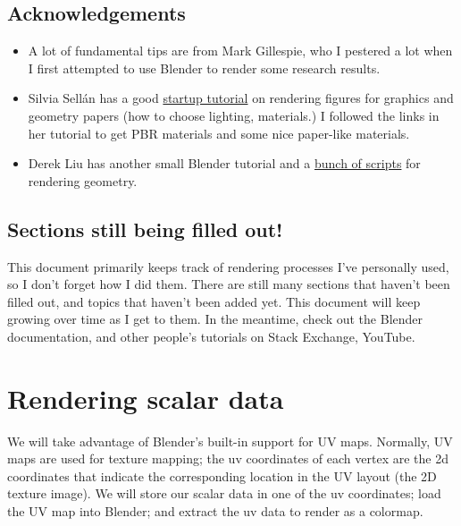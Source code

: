\documentclass[10pt]{article}
\begin{document}
\subsection{Acknowledgements}
\begin{itemize}
    \item A lot of fundamental tips are from Mark Gillespie, who I pestered a lot when I first attempted to use Blender to render some research results.
    \item Silvia Sell\'an has a good \href{https://www.silviasellan.com/blender_figure.html}{startup tutorial} on rendering figures for graphics and geometry papers (how to choose lighting, materials.) I followed the links in her tutorial to get PBR materials and some nice paper-like materials.
    \item Derek Liu has another small Blender tutorial and a \href{https://github.com/HTDerekLiu/BlenderToolbox}{bunch of scripts} for rendering geometry.
\end{itemize}

\subsection{Sections still being filled out!}
This document primarily keeps track of rendering processes I've personally used, so I don't forget how I did them. There are still many sections that haven't been filled out, and topics that haven't been added yet. This document will keep growing over time as I get to them. In the meantime, check out the Blender documentation, and other people's tutorials on Stack Exchange, YouTube.

\newpage 

\section{Rendering scalar data}
\label{sec:scalar_data}
We will take advantage of Blender's built-in support for UV maps. Normally, UV maps are used for texture mapping; the uv coordinates of each vertex are the 2d coordinates that indicate the corresponding location in the UV layout (the 2D texture image). We will store our scalar data in one of the uv coordinates; load the UV map into Blender; and extract the uv data to render as a colormap.
\end{document}
